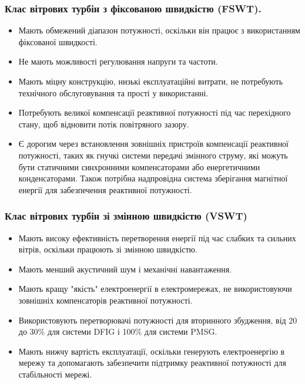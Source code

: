 \documentclass{beamer}
\begin{document}
    \begin{frame}
        \frametitle{Клас вітрових турбін з фіксованою швидкістю (FSWT).}
        \begin{itemize}
            \item Мають обмежений діапазон потужності, оскільки він працює з використанням фіксованої швидкості. 
            \item Не мають можливості регулювання напруги та частоти. 
            \item Мають міцну конструкцію, низькі експлуатаційні витрати, не потребують технічного обслуговування та прості у використанні.
            \item Потребують великої компенсації реактивної потужності під час перехідного стану, щоб відновити потік повітряного зазору. 
            \item Є дорогим через встановлення зовнішніх пристроїв компенсації реактивної потужності, таких як гнучкі системи передачі змінного струму, 
            які можуть бути статичними синхронними компенсаторами або енергетичними конденсаторами. 
            Також потрібна надпровідна система зберігання магнітної енергії для забезпечення реактивної потужності.
        \end{itemize}
    \end{frame}

    \begin{frame}
        \frametitle{Клас вітрових турбін зі змінною швидкістю (VSWT)}
        \begin{itemize}
            \item Мають високу ефективність перетворення енергії під час слабких та сильних вітрів, оскільки працюють зі змінною швидкістю.
            \item Мають менший акустичний шум і механічні навантаження.
            \item Мають кращу "якість" електроенергії в електромережах, не використовуючи зовнішніх компенсаторів реактивної потужності.
            \item Використовують перетворювачі потужності для вторинного збудження, від 20 до 30\% для системи DFIG і 100\% для системи PMSG.
            \item Мають нижчу вартість експлуатації, оскільки генерують електроенергію в мережу та допомагають забезпечити підтримку реактивної потужності для стабільності мережі.
        \end{itemize}
    \end{frame}
    
\end{document}
